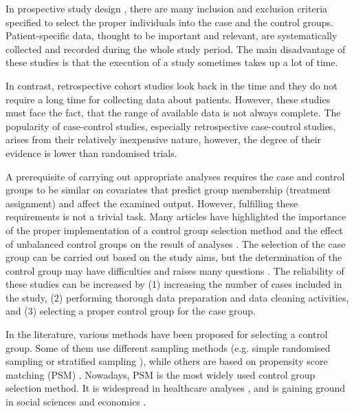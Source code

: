 In prospective study design \cite{wacholder1992selection3, iwagami2022introduction}, there are many inclusion and exclusion criteria specified to select the proper individuals into the case and the control groups. Patient-specific data, thought to be important and relevant, are systematically collected and recorded during the whole study period. The main disadvantage of these studies is that the execution of a study sometimes takes up a lot of time.

In contrast, retrospective cohort studies \cite{wacholder1992selection3, iwagami2022introduction} look back in the time and they do not require a long time for collecting data about patients. However, these studies must face the fact, that the range of available data is not always complete. The popularity of case-control studies, especially retrospective case-control studies, arises from their relatively inexpensive nature, however, the degree of their evidence is lower than randomised trials.

A prerequisite of carrying out appropriate analyses requires the case and control groups to be similar on covariates that predict group membership (treatment assignment) and affect the examined output. However, fulfilling these requirements is not a trivial task. Many articles have highlighted the importance of the proper implementation of a control group selection method and the effect of unbalanced control groups on the result of analyses \cite{harris2002control, pell2008selection, behar2008effect, ripollone2018implications, moser2019out}. The selection of the case group can be carried out based on the study aims, but the determination of the control group may have difficulties and raises many questions \cite{wacholder1992selection, koepsell2014epidemiologic}. The reliability of these studies can be increased by (1) increasing the number of cases included in the study, (2) performing thorough data preparation and data cleaning activities, and (3) selecting a proper control group for the case group.

In the literature, various methods have been proposed for selecting a control group. Some of them use different sampling methods (e.g. simple randomised sampling or stratified sampling \cite{jewell1985least, singh2003stratified}), while others are based on propensity score matching (PSM) \cite{rosenbaum1983central, austin2011introduction}. Nowadays, PSM \cite{rosenbaum1983central} is the most widely used control group selection method. It is widespread in healthcare analyses \cite{shin2015comparative, tokuda2019clinical, chuang2019acute}, and is gaining ground in social sciences \cite{thoemmes2011systematic, hwang2018rethinking, xu2020examining} and economics \cite{shipman2017propensity, peel2009propensity, cushman2017exchange, rosholm2019bridging}.

